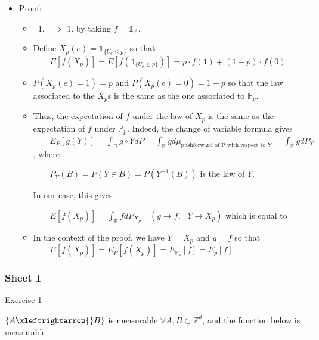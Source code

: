 \documentclass[
  letterpaper,
  DIV=11,
  numbers=noendperiod]{scrartcl}
\providecommand{\tightlist}{%
  \setlength{\itemsep}{0pt}\setlength{\parskip}{0pt}}\usepackage{longtable,booktabs,array}
\begin{document}
\begin{itemize}
  \begin{itemize}
  \item
    Proof:

    \begin{itemize}
    \item
      \begin{enumerate}
      \def\labelenumi{\arabic{enumi}.}
      \setcounter{enumi}{1}
      \tightlist
      \item
        \(\implies\) 1. by taking \(f = \mathbb{1}_A\).
      \end{enumerate}
    \item
      Define \(X_p(e) = \mathbb{1}_{\{U_e \leq p\}}\) so that
      \(\qquad E[f(X_p)] = E[f(\mathbb{1}_{\{U_e \leq p\}})] = p \cdot f(1) + (1 - p) \cdot f(0)\)
    \item
      \(P(X_p(e) = 1) = p\) and \(P(X_p(e) = 0) = 1 - p\) so that the
      law associated to the \(X_p\)s is the same as the one associated
      to \(\mathbb{P}_p\).
    \item
      Thus, the expectation of \(f\) under the law of \(X_p\) is the
      same as the expectation of \(f\) under \(\mathbb{P}_p\). Indeed,
      the change of variable formula gives
      \(\qquad E_P[g(Y)] = \int_{\Omega} g \circ Y dP = \int_{\mathbb{R}} g d \mu_{\text{pushforward of P with respect to Y}} = \int_{\mathbb{R}} g dP_Y\),
      where

      \(\qquad P_Y(B) = P(Y \in B) = P(Y^{-1}(B))\) is the law of \(Y\).

      In our case, this gives

      \(\qquad E[f(X_p)] = \int_{\mathbb{R}} f dP_{X_p} \quad (g \to f, \text{ } Y \to X_p)\)
      which is equal to
    \item
      In the context of the proof, we have \(Y = X_p\) and \(g = f\) so
      that
      \(\qquad E[f(X_p)] = E_P[f(X_p)] = E_{\mathbb{P}_p}[f] = E_p[f]\)
    \end{itemize}
  \end{itemize}
\end{itemize}

\subsubsection{Sheet 1}\label{sheet-1}

Exercise 1

\(\{A \xleftrightarrow{} B\}\) is measurable
\(\forall A, B \subset \mathbb{Z}^d\), and the function below is
measurable.
\end{document}
